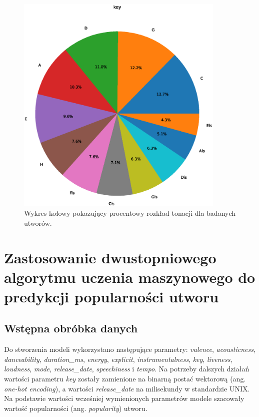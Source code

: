 \documentclass[a4paper,11pt]{article}
\begin{document}
    \begin{figure}[H]
        \label{fig:key}
        \centering
        \includegraphics[width=10cm,keepaspectratio]{key}
        \caption{Wykres kołowy pokazujący procentowy rozkład tonacji dla badanych utworów.}
    \end{figure}

    \newpage


    \section{Zastosowanie dwustopniowego algorytmu uczenia maszynowego do predykcji popularności utworu}

    \subsection{Wstępna obróbka danych}

    Do stworzenia modeli wykorzystano następujące parametry: \textit{valence}, \textit{acousticness}, \textit{danceability}, \textit{duration\_ms}, \textit{energy}, \textit{explicit}, \textit{instrumentalness}, \textit{key}, \textit{liveness}, \textit{loudness}, \textit{mode}, \textit{release\_date}, \textit{speechiness} i \textit{tempo}. Na potrzeby dalszych działań wartości parametru \textit{key} zostały zamienione na binarną postać wektorową (ang. \textit{one-hot encoding}), a wartości \textit{release\_date} na milisekundy w standardzie UNIX. Na podstawie wartości wcześniej wymienionych parametrów modele szacowały wartość popularności (ang. \textit{popularity}) utworu.
\end{document}
